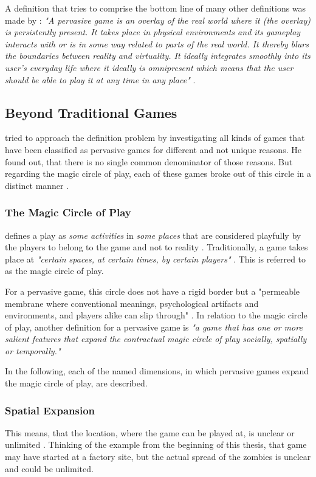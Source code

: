 A definition that tries to comprise the bottom line of many other definitions was made by \citeauthor{hock2014augmented}: \emph{"A pervasive game is an overlay of the real world where it (the overlay) is persistently present. It takes place in physical environments and its gameplay interacts with or is in some way related to parts of the real world. It thereby blurs the boundaries between reality and virtuality. It ideally integrates smoothly into its user's everyday life where it ideally is omnipresent which means that the user should be able to play it at any time in any place"} \citep{hock2014augmented}.


\subsection{Beyond Traditional Games}
\citeauthor{montola2005exploring} tried to approach the definition problem by investigating all kinds of games that have been classified as pervasive games for different and not unique reasons. He found out, that there is no single common denominator of those reasons. But regarding the magic circle of play, each of these games broke out of this circle in a distinct manner \citep{montola2005exploring}.

\subsubsection{The Magic Circle of Play}
\citeauthor{huizinga1955homo} defines a play as \emph{some activities} in \emph{some places} that are considered playfully by the players to belong to the game and not to reality \citep{huizinga1955homo}. Traditionally, a game takes place at \emph{"certain spaces, at certain times, by certain players"} \citep{montola2005exploring}. This is referred to as the magic circle of play.

For a pervasive game, this circle does not have a rigid border but a "permeable membrane where conventional meanings, psychological artifacts and environments, and players alike can slip through" \citep{nieuwdorp2005}. In relation to the magic circle of play, another definition for a pervasive game is \emph{"a game that has one or more salient features that expand the contractual magic circle of play socially, spatially or temporally."} \citep{montola2005exploring}

In the following, each of the named dimensions, in which pervasive games expand the magic circle of play, are described.

\subsubsection{Spatial Expansion}
This means, that the location, where the game can be played at, is unclear or unlimited \citep{montola2005exploring}. Thinking of the example from the beginning of this thesis, that game may have started at a factory site, but the actual spread of the zombies is unclear and could be unlimited.


